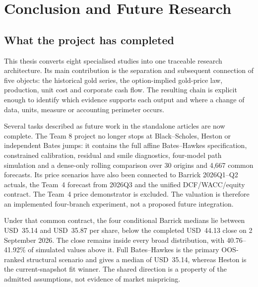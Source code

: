 \chapter*{Conclusion and Future Research}

\section*{What the project has completed}

This thesis converts eight specialised studies into one traceable research
architecture. Its main contribution is the separation and subsequent
connection of five objects: the historical gold series, the option-implied
gold-price law, production, unit cost and corporate cash flow. The resulting
chain is explicit enough to identify which evidence supports each output and
where a change of data, units, measure or accounting perimeter occurs.

Several tasks described as future work in the standalone articles are now
complete. The Team 8 project no longer stops at Black--Scholes, Heston or
independent Bates jumps: it contains the full affine Bates--Hawkes
specification, constrained calibration, residual and smile diagnostics,
four-model path simulation and a dense-only rolling comparison over 30 origins and 4,667 common forecasts. Its
price scenarios have also been connected to Barrick 2026Q1--Q2 actuals, the
Team~4 forecast from 2026Q3 and the unified DCF/WACC/equity contract. The
Team~4 price demonstrator is excluded. The valuation is therefore an implemented
four-branch experiment, not a proposed future integration.

Under that common contract, the four conditional Barrick medians lie between
USD~35.14 and USD~35.87 per share, below the completed USD~44.13 close
on 2 September 2026. The close remains inside every broad distribution,
with 40.76--41.92\% of simulated values above it. Full Bates--Hawkes is the
primary OOS-ranked structural scenario and gives a median of USD~35.14,
whereas Heston is the current-snapshot fit winner. The shared direction
is a property of the admitted assumptions, not evidence of market mispricing.

